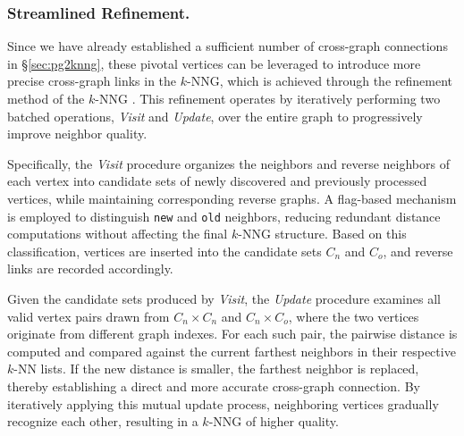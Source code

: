 \documentclass[acmsmall]{acmart}
\theoremstyle{remark}
\theoremstyle{definition}
\begin{document}
\subsubsection{Streamlined Refinement.}
\label{subsubsec:streamlined_refinement}

Since we have already established a sufficient number of cross-graph connections in \S\ref{sec:pg2knng}, these pivotal vertices can be leveraged to introduce more precise cross-graph links in the $k$-NNG, which is achieved through the refinement method of the $k$-NNG \cite{dong2011efficient}. This refinement operates by iteratively performing two batched operations, \textit{Visit} and \textit{Update}, over the entire graph to progressively improve neighbor quality.

Specifically, the \textit{Visit} procedure organizes the neighbors and reverse neighbors of each vertex into candidate sets of newly discovered and previously processed vertices, while maintaining corresponding reverse graphs. A flag-based mechanism is employed to distinguish \texttt{new} and \texttt{old} neighbors, reducing redundant distance computations without affecting the final $k$-NNG structure. Based on this classification, vertices are inserted into the candidate sets $C_n$ and $C_o$, and reverse links are recorded accordingly.

Given the candidate sets produced by \textit{Visit}, the \textit{Update} procedure examines all valid vertex pairs drawn from $C_n \times C_n$ and $C_n \times C_o$, where the two vertices originate from different graph indexes. For each such pair, the pairwise distance is computed and compared against the current farthest neighbors in their respective $k$-NN lists. If the new distance is smaller, the farthest neighbor is replaced, thereby establishing a direct and more accurate cross-graph connection. By iteratively applying this mutual update process, neighboring vertices gradually recognize each other, resulting in a $k$-NNG of higher quality.
\end{document}
